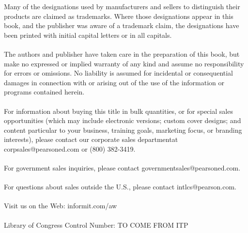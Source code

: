 \thispagestyle{empty}
\vspace*{\fill}
{\footnotesize\raggedright 
\noindent Many of the designations used by manufacturers and sellers to distinguish their products are claimed as trademarks. Where those designations appear in this book, and the publisher was aware of a trademark claim, the designations have been printed with initial capital letters or in all capitals.\\
\hspace{\fill}\\
\noindent The authors and publisher have taken care in the preparation of this book, but make no expressed or implied warranty of any kind and assume no responsibility for errors or omissions. No liability is assumed for incidental or consequential damages in connection with or arising out of the use of the information or programs contained herein.\\   %
\hspace{\fill}\\
\noindent For information about buying this title in bulk quantities, or for special sales opportunities (which may include electronic versions; custom cover designs; and content particular to your business, training goals, marketing focus, or branding interests), please contact our corporate sales department\linebreak[4] at \mbox{corpsales}@\mbox{pearsoned.com} or (800) 382-3419.\\
\hspace{\fill}\\
\noindent For government sales inquiries, please contact governmentsales@pearsoned.com.\\
\hspace{\fill}\\
\noindent For questions about sales outside the U.S., please contact intlcs@pearson.com.\\
\hspace{\fill}\\
\noindent Visit us on the Web: informit.com/aw\\     %
\hspace{\fill}\\
\noindent Library of Congress Control Number: TO COME FROM ITP\\  %
}

